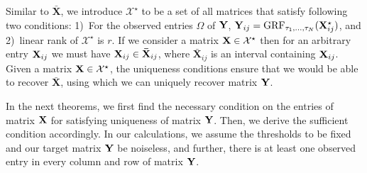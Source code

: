 \documentclass{article}
\newcommand{\sameer}[1]{\todo[color=blue!20]{\textbf{s:} #1}{}}
\begin{document}
Similar to $\mathbf{\bar X}$, we introduce $\mathcal{X}^{\star}$ to be a set of all matrices that satisfy following two conditions: 1)~For the observed entries $\Omega$ of $\mathbf{Y}$, $\mathbf{Y}_{ij}=\text{GRF}_{\tau_1,...,\tau_N}(\mathbf{X}^{\star}_{ij})$, and 2)~linear rank of $\mathcal{X}^{\star}$ is $r$. %
If we consider a matrix $\mathbf{X} \in \mathcal{X}^{\star}$ then for an arbitrary entry $\mathbf{X}_{ij}$ we must have $\mathbf{X}_{ij} \in \mathbf{\bar X}_{ij}$, where $\mathbf{\bar X}_{ij}$ is an interval containing $\mathbf{X}_{ij}$. %
Given a matrix $\mathbf{X}\in\mathcal{X}^{\star}$, the uniqueness conditions ensure that we would be able to recover $\mathbf{\bar X}$, using which we can uniquely recover matrix $\mathbf{Y}$. %


In the next theorems, we first find the necessary condition on the entries of matrix $\mathbf{X}$ for satisfying uniqueness of matrix $\mathbf{Y}$. Then, we derive the sufficient condition accordingly.
In our calculations, we assume the thresholds to be fixed and our target matrix $\mathbf{Y}$ be noiseless, and further, there is at least one observed entry in every column and row of matrix $\mathbf{Y}$. %
\end{document}
